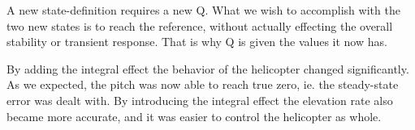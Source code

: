 A new state-definition requires a new Q. What we wish to accomplish with the two new states is to reach the reference, without actually effecting the overall stability or transient response. That is why Q is given the values it now has. 

By adding the integral effect the behavior of the helicopter changed significantly. As we expected, the pitch was now able to reach true zero, ie. the steady-state error was dealt with. By introducing the integral effect the elevation rate also became more accurate, and it was easier to control the helicopter as whole. 